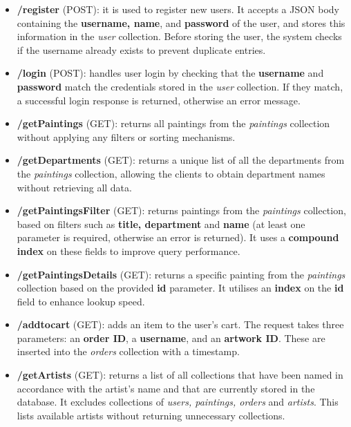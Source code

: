 \documentclass[a4paper,12pt]{article}
\begin{document}
\begin{itemize}

      \item \textbf{/register} (POST): it is used to register new users. It accepts a JSON body containing the \textbf{username, name}, and \textbf{password} of the user, and stores this information in the \textit{user} collection. Before storing the user, the system checks if the username already exists to prevent duplicate entries.

      \item \textbf{/login} (POST): handles user login by checking that the \textbf{username} and \textbf{password} match the credentials stored in the \textit{user} collection. If they match, a successful login response is returned, otherwise an error message.

      \item \textbf{/getPaintings} (GET): returns all paintings from the \textit{paintings} collection without applying any filters or sorting mechanisms.

      \item \textbf{/getDepartments} (GET): returns a unique list of all the departments from the \textit{paintings} collection, allowing the clients to obtain department names without retrieving all data.


      \item \textbf{/getPaintingsFilter} (GET): returns paintings from the \textit{paintings} collection, based on filters such as \textbf{title, department} and \textbf{name} (at least one parameter is required, otherwise an error is returned). It uses a \textbf{compound index} on these fields to improve query performance.

      \item \textbf{/getPaintingsDetails} (GET): returns a specific painting from the \textit{paintings} collection based on the provided \textbf{id} parameter. It utilises an \textbf{index} on the \textbf{id} field to enhance lookup speed.

      \item \textbf{/addtocart} (GET): adds an item to the user's cart. The request takes three parameters: an \textbf{order ID}, a \textbf{username}, and an \textbf{artwork ID}. These are inserted into the \textit{orders} collection with a timestamp.

      \item \textbf{/getArtists} (GET): returns a list of all collections that have been named in accordance with the artist's name and that are currently stored in the database. It excludes collections of  \textit{users, paintings, orders} and \textit{artists}. This lists available artists without returning unnecessary collections.


\end{itemize}
\end{document}
